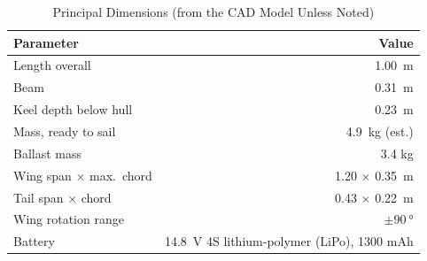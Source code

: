 \begin{table}[!t]
\caption{Principal Dimensions (from the CAD Model Unless Noted)}
\label{tab:specs}
\centering
\begin{tabular}{@{}lr@{}}
\toprule
Parameter & Value \\
\midrule
Length overall                 & \SI{1.00}{\meter} \\
Beam                           & \SI{0.31}{\meter} \\
Keel depth below hull          & \SI{0.23}{\meter} \\
Mass, ready to sail            & \SI{4.9}{\kilo\gram} (est.) \\
Ballast mass                   & 3.4 {kg} \\
Wing span $\times$ max.\ chord & 1.20 $\times$ \SI{0.35}{\meter} \\
Tail span $\times$ chord       & 0.43 $\times$ \SI{0.22}{\meter} \\
Wing rotation range            & $\pm\SI{90}{\degree}$ \\
Battery                        & \SI{14.8}{\volt} 4S lithium-polymer (LiPo), 1300 mAh \\
\bottomrule
\end{tabular}
\end{table}

